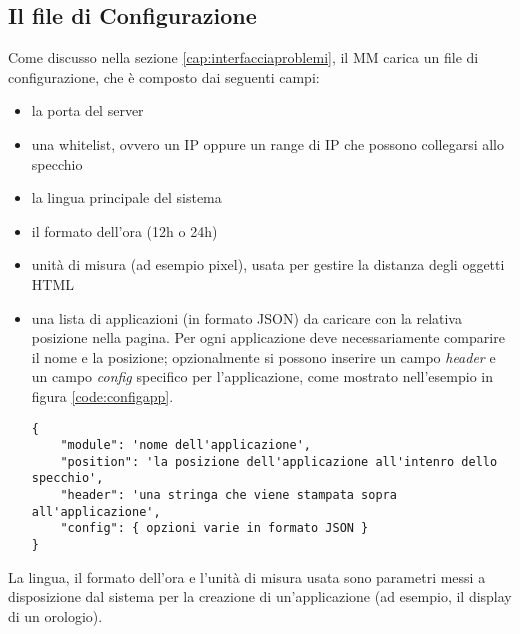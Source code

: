 \subsection{Il file di Configurazione}\label{cap:MMconf}
Come discusso nella sezione \ref{cap:interfacciaproblemi}, il MM carica un file di configurazione, che \`e composto dai seguenti campi:
\begin{itemize}
\item la porta del server
\item una whitelist, ovvero un IP oppure un range di IP che possono collegarsi allo specchio
\item la lingua principale del sistema
\item il formato dell'ora (12h o 24h)
\item unit\`a di misura (ad esempio pixel), usata per gestire la distanza degli oggetti HTML
\item una lista di applicazioni (in formato JSON) da caricare con la relativa posizione nella pagina. Per ogni applicazione deve necessariamente comparire il
nome e la posizione; opzionalmente si possono inserire un campo  \textit{header} e un campo \textit{config} specifico per l'applicazione, come mostrato
nell'esempio in figura \ref{code:configapp}.
\begin{lstlisting}[label={code:configapp}, caption={Campi di configurazione di un modulo nel MM}, captionpos=b]
{
	"module": 'nome dell'applicazione',
	"position": 'la posizione dell'applicazione all'intenro dello specchio',
	"header": 'una stringa che viene stampata sopra all'applicazione',
	"config": { opzioni varie in formato JSON }
}
\end{lstlisting}
\end{itemize}
La lingua, il formato dell'ora e l'unit\`a di misura usata sono parametri messi a disposizione dal sistema per la creazione di un'applicazione
(ad esempio, il display di un orologio).

